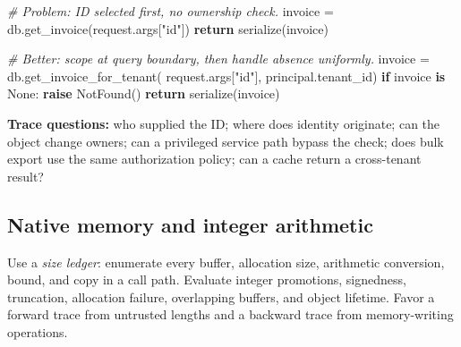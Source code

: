 \documentclass[
  letterpaper,
]{article}
\newenvironment{Shaded}{}{}
\newcommand{\CommentTok}[1]{\textcolor[rgb]{0.38,0.63,0.69}{\textit{#1}}}
\newcommand{\ControlFlowTok}[1]{\textcolor[rgb]{0.00,0.44,0.13}{\textbf{#1}}}
\newcommand{\KeywordTok}[1]{\textcolor[rgb]{0.00,0.44,0.13}{\textbf{#1}}}
\newcommand{\NormalTok}[1]{#1}
\newcommand{\OperatorTok}[1]{\textcolor[rgb]{0.40,0.40,0.40}{#1}}
\newcommand{\StringTok}[1]{\textcolor[rgb]{0.25,0.44,0.63}{#1}}
\newcommand{\VariableTok}[1]{\textcolor[rgb]{0.10,0.09,0.49}{#1}}
\begin{document}
\begin{Shaded}
\begin{Highlighting}[]
\CommentTok{\# Problem: ID selected first, no ownership check.}
\NormalTok{invoice }\OperatorTok{=}\NormalTok{ db.get\_invoice(request.args[}\StringTok{"id"}\NormalTok{])}
\ControlFlowTok{return}\NormalTok{ serialize(invoice)}

\CommentTok{\# Better: scope at query boundary, then handle absence uniformly.}
\NormalTok{invoice }\OperatorTok{=}\NormalTok{ db.get\_invoice\_for\_tenant(}
\NormalTok{    request.args[}\StringTok{"id"}\NormalTok{], principal.tenant\_id)}
\ControlFlowTok{if}\NormalTok{ invoice }\KeywordTok{is} \VariableTok{None}\NormalTok{:}
    \ControlFlowTok{raise}\NormalTok{ NotFound()}
\ControlFlowTok{return}\NormalTok{ serialize(invoice)}
\end{Highlighting}
\end{Shaded}

\textbf{Trace questions:} who supplied the ID; where does identity
originate; can the object change owners; can a privileged service path
bypass the check; does bulk export use the same authorization policy;
can a cache return a cross-tenant result?

\subsection{Native memory and integer
arithmetic}\label{native-memory-and-integer-arithmetic}

Use a \emph{size ledger}: enumerate every buffer, allocation size,
arithmetic conversion, bound, and copy in a call path. Evaluate integer
promotions, signedness, truncation, allocation failure, overlapping
buffers, and object lifetime. Favor a forward trace from untrusted
lengths and a backward trace from memory-writing operations.
\end{document}

